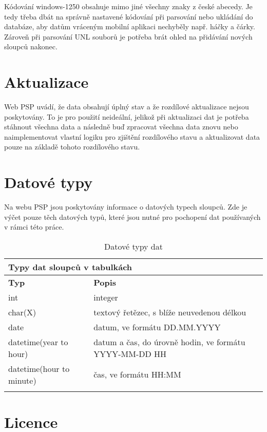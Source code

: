 \noindent Kódování windows-1250 obsahuje mimo jiné všechny znaky z české abecedy. Je tedy třeba dbát na správně nastavené kódování při parsování nebo ukládání do databáze, aby datům vráceným mobilní aplikaci nechyběly např. háčky a čárky. Zároveň při parsování UNL souborů je potřeba brát ohled na přidávání nových sloupců nakonec.

\section{Aktualizace}
Web PSP \cite{psp-data} uvádí, že data obsahují úplný stav a že rozdílové aktualizace nejsou poskytovány. To je pro použití neideální, jelikož při aktualizaci dat je potřeba stáhnout všechna data a následně buď zpracovat všechna data znovu nebo naimplementovat vlastní logiku pro zjištění rozdílového stavu a aktualizovat data pouze na základě tohoto rozdílového stavu. 

\section{Datové typy}
Na webu PSP \cite{psp-data} jsou poskytovány informace o datových typech sloupců. Zde je výčet pouze těch datových typů, které jsou nutné pro pochopení dat používaných v rámci této práce.

\begin{longtable}{|l|p{9cm}|} \hline
	\multicolumn{2}{|l|}{\textbf{Typy dat sloupců v tabulkách}} \\ \hline
	\textbf{Typ} & \textbf{Popis} \\ \hline
	
	int	& integer \\ \hline
	
	char(X)		& textový řetězec, s blíže neuvedenou délkou
	\\ \hline

	date	& datum, ve formátu DD.MM.YYYY
	\\ \hline	
	
	datetime(year to hour)		& datum a čas, do úrovně hodin, ve formátu YYYY-MM-DD HH
	
	\\ \hline
	
	datetime(hour to minute)		& čas, ve formátu HH:MM
	\\ \hline
	
	\caption{Datové typy dat}
	\label{table:data_types}
\end{longtable}

\section{Licence}

